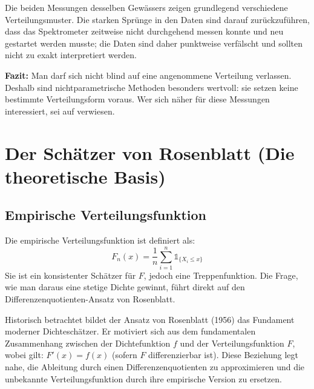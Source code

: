 \documentclass[a4paper, 11pt]{scrartcl}
\begin{document}
Die beiden Messungen desselben Gewässers zeigen grundlegend verschiedene Verteilungsmuster. Die starken Sprünge in den Daten sind darauf zurückzuführen, dass das Spektrometer zeitweise nicht durchgehend messen konnte und neu gestartet werden musste; die Daten sind daher punktweise verfälscht und sollten nicht zu exakt interpretiert werden.

\textbf{Fazit:} Man darf sich nicht blind auf eine angenommene Verteilung verlassen. Deshalb sind nichtparametrische Methoden besonders wertvoll: sie setzen keine bestimmte Verteilungsform voraus. Wer sich näher für diese Messungen interessiert, sei auf \cite{DalItter2026, DalItter2021} verwiesen.

\section{Der Schätzer von Rosenblatt (Die theoretische Basis)}

\subsection*{Empirische Verteilungsfunktion}

Die empirische Verteilungsfunktion ist definiert als:
\[
F_n(x) = \frac{1}{n} \sum_{i=1}^n \mathds{1}_{\{X_i \le x\}}
\]
Sie ist ein konsistenter Schätzer für $F$, jedoch eine Treppenfunktion. Die Frage, wie man daraus eine stetige Dichte gewinnt, führt direkt auf den Differenzenquotienten-Ansatz von Rosenblatt.

Historisch betrachtet bildet der Ansatz von Rosenblatt \cite{Rosenblatt1956} (1956) das Fundament moderner Dichteschätzer. Er motiviert sich aus dem fundamentalen Zusammenhang zwischen der Dichtefunktion $f$ und der Verteilungsfunktion $F$, wobei gilt: $F'(x) = f(x)$ (sofern $F$ differenzierbar ist). Diese Beziehung legt nahe, die Ableitung durch einen Differenzenquotienten zu approximieren und die unbekannte Verteilungsfunktion durch ihre empirische Version zu ersetzen.
\end{document}
